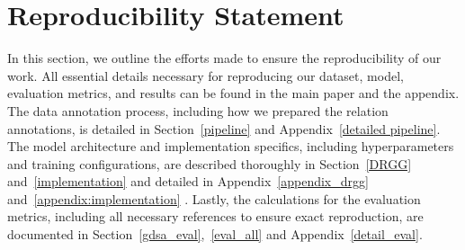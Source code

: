 \section*{Reproducibility Statement}

In this section, we outline the efforts made to ensure the reproducibility of our work. All essential details necessary for reproducing our dataset, model, evaluation metrics, and results can be found in the main paper and the appendix. The data annotation process, including how we prepared the relation annotations, is detailed in Section~\ref{pipeline} and Appendix~\ref{detailed pipeline}. The model architecture and implementation specifics, including hyperparameters and training configurations, are described thoroughly in Section~\ref{DRGG} and~\ref{implementation} and detailed in Appendix~\ref{appendix_drgg} and~\ref{appendix:implementation} . Lastly, the calculations for the evaluation metrics, including all necessary references to ensure exact reproduction, are documented in Section~\ref{gdsa_eval},~\ref{eval_all} and Appendix~\ref{detail_eval}.